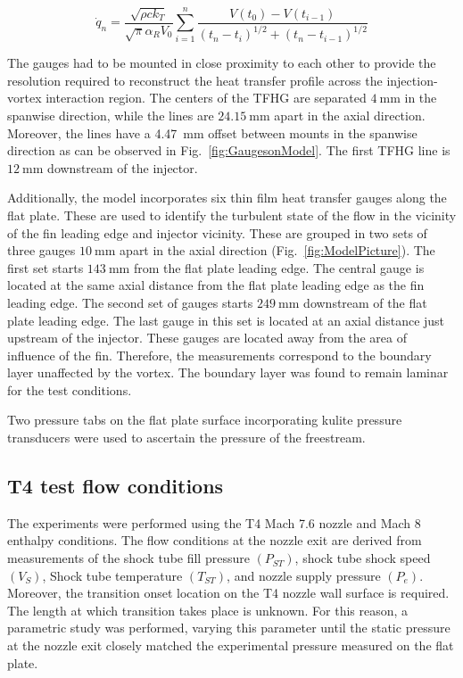 \documentclass{AIAA}
\begin{document}
\begin{equation}
\dot{q}_n = \frac{\sqrt{\rho c k_T}}{\sqrt{\pi}\alpha_R V_0}\sum^n_{i=1}\frac{V\left(t_0\right)-V\left(t_{i-1}\right)}{\left(t_n-t_i\right)^{1/2}+\left(t_n-t_{i-1}\right)^{1/2}}
\label{eq:TFHG_Heat} 
\end{equation}


The gauges had to be mounted in close proximity to each other to provide the resolution required to reconstruct the heat transfer profile across the injection-vortex interaction region.
The centers of the TFHG are separated $\SI{4}{\milli\meter}$ in the spanwise direction, while the lines are $\SI{24.15}{\milli\meter}$ apart in the axial direction.
Moreover, the lines have a \SI{4.47}{\milli\meter} offset between mounts in the spanwise direction as can be observed in Fig.~\ref{fig:GaugesonModel}.
The first TFHG line is $\SI{12}{\milli\meter}$ downstream of the injector.


Additionally, the model incorporates six thin film heat transfer gauges along the flat plate.
These are used to identify the turbulent state of the flow in the vicinity of the fin leading edge and injector vicinity.
These are grouped in two sets of three gauges $\SI{10}{\milli\meter}$ apart in the axial direction (Fig.~\ref{fig:ModelPicture}).
The first set starts $\SI{143}{\milli\meter}$ from the flat plate leading edge.
The central gauge is located at the same axial distance from the flat plate leading edge as the fin leading edge.
The second set of gauges starts $\SI{249}{\milli\meter}$ downstream of the flat plate leading edge.
The last gauge in this set is located at an axial distance just upstream of the injector.
These gauges are located away from the area of influence of the fin. Therefore, the measurements correspond to the boundary layer unaffected by the vortex.
The boundary layer was found to remain laminar for the test conditions.

Two pressure tabs on the flat plate surface incorporating kulite pressure transducers were used to ascertain the pressure of the freestream.


\subsection{T4 test flow conditions}

The experiments were performed using the T4 Mach 7.6 nozzle and Mach 8 enthalpy conditions.
The flow conditions at the nozzle exit are derived from measurements of the shock tube fill pressure $\left(P_{ST}\right)$, shock tube shock speed $\left(V_{S}\right)$, Shock tube temperature $\left(T_{ST}\right)$, and nozzle supply pressure $\left(P_e\right)$.
Moreover, the transition onset location on the T4 nozzle wall surface is required.
The length at which transition takes place is unknown.
For this reason, a parametric study was performed, varying this parameter until the static pressure at the nozzle exit closely matched the experimental pressure measured on the flat plate.
\end{document}
